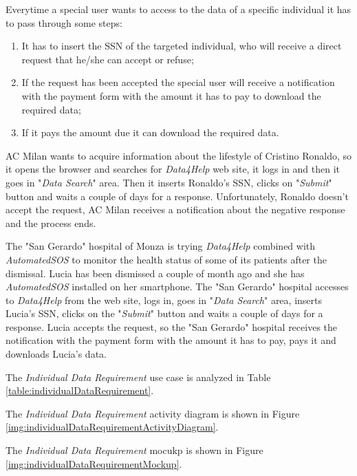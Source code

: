 Everytime a special user wants to access to the data of a specific individual it has to pass through some steps:
\begin{enumerate}
  \item It has to insert the SSN of the targeted individual, who will receive a direct request that he/she can accept or refuse;
  \item If the request has been accepted the special user will receive a notification with the payment form with the amount it has to pay to download the required data;
  \item If it pays the amount due it can download the required data.
\end{enumerate}

AC Milan wants to acquire information about the lifestyle of Cristino Ronaldo, so it opens the browser and searches for \textit{Data4Help} web site, it logs in and then it goes in "\textit{Data Search}" area. Then it inserts Ronaldo's SSN, clicks on "\textit{Submit}" button and waits a couple of days for a response. Unfortunately, Ronaldo doesn't accept the request, AC Milan receives a notification about the negative response and the process ends.

The "San Gerardo" hospital of Monza is trying \textit{Data4Help} combined with \textit{AutomatedSOS} to monitor the health status of some of its patients after the dismissal. Lucia has been dismissed a couple of month ago and she has \textit{AutomatedSOS} installed on her smartphone. The "San Gerardo" hospital accesses to \textit{Data4Help} from the web site, logs in, goes in "\textit{Data Search}" area, inserts Lucia's SSN, clicks on the "\textit{Submit}" button and waits a couple of days for a response. Lucia accepts the request, so the "San Gerardo" hospital receives the notification with the payment form with the amount it has to pay, pays it and downloads Lucia's data.

The \textit{Individual Data Requirement} use case is analyzed in Table \ref{table:individualDataRequirement}.

The \textit{Individual Data Requirement} activity diagram is shown in Figure \ref{img:individualDataRequirementActivityDiagram}.

The \textit{Individual Data Requirement} mocukp is shown in Figure \ref{img:individualDataRequirementMockup}.

